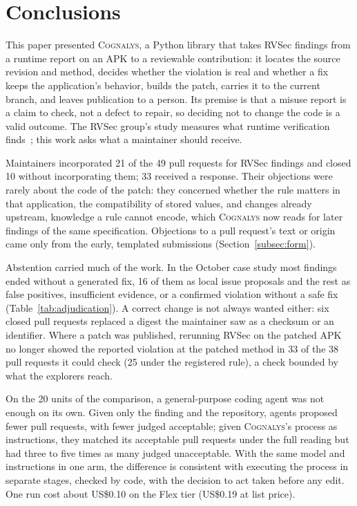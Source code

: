 \documentclass[conference]{IEEEtran}
\newcommand{\system}{\textsc{Cognalys}}
\begin{document}
\section{Conclusions}
\label{sec:conclusion}

This paper presented \system{}, a Python library that takes RVSec findings from
a runtime report on an APK to a reviewable contribution: it locates the source
revision and method, decides whether the violation is real and whether a fix
keeps the application's behavior, builds the patch, carries it to the current
branch, and leaves publication to a person. Its premise is that a misuse report
is a claim to check, not a defect to repair, so deciding not to change the code
is a valid outcome. The RVSec group's study measures what runtime verification
finds~\cite{costa2026effectiveness}; this work asks what a maintainer should
receive.

Maintainers incorporated 21 of the 49 pull requests for RVSec findings and
closed 10 without incorporating them; 33 received a response. Their objections
were rarely about the code of the patch: they concerned whether the rule
matters in that application, the compatibility of stored values, and changes
already upstream, knowledge a rule cannot encode, which \system{} now reads
for later findings of the same specification. Objections to a pull request's text
or origin came only from the early, templated submissions (Section~\ref{subsec:form}).

Abstention carried much of the work. In the October case study most findings
ended without a generated fix, 16 of them as local issue proposals and the
rest as false positives, insufficient evidence, or a confirmed violation
without a safe fix (Table~\ref{tab:adjudication}). A correct change is not
always wanted either: six closed pull requests replaced a digest the maintainer
saw as a checksum or an identifier. Where a patch was published, rerunning RVSec on
the patched APK no longer showed the reported violation at the patched method
in 33 of the 38 pull requests it could check (25 under the registered rule), a
check bounded by what the explorers reach.

On the 20 units of the comparison, a general-purpose coding agent was not enough on its own. Given only the
finding and the repository, agents proposed fewer pull requests, with fewer
judged acceptable; given \system{}'s process as instructions, they matched its
acceptable pull requests under the full reading but had three to five times as many judged
unacceptable. With the same model and instructions in one arm, the difference is consistent with
executing the process in separate stages, checked by code, with the decision to
act taken before any edit. One run cost about US\$0.10 on the Flex tier
(US\$0.19 at list price).
\end{document}
